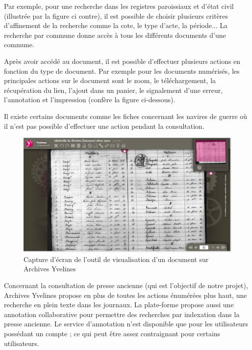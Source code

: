         Par exemple, pour une recherche dans les registres paroissiaux et d’état civil (illustrée par la figure ci contre),
        il est possible de choisir plusieurs critères d’affinement de la recherche comme la cote, le type d’acte, la période...
        La recherche par commune donne accès à tous les différents documents d’une commune.

        Après avoir accédé au document, il est possible d’effectuer plusieurs actions en fonction du type de document.
        Par exemple pour les documents numérisés, les principales actions sur le document sont le zoom, le téléchargement,
        la récupération du lien, l’ajout dans un panier, le signalement d’une erreur, l’annotation et l’impression (confère la figure ci-dessous).

        Il existe certains documents comme les fiches concernant les navires de guerre où il n’est pas possible d’effectuer
        une action pendant la consultation.

        \begin{figure}[h!]
            \centering
            \includegraphics[width=1\textwidth]{figure/screen_yvelines_document.png}
            \caption{Capture d'écran de l'outil de visualisation d'un document sur Archives Yvelines}
            \label{fig:yvelines_doc}
        \end{figure}

        Concernant la consultation de presse ancienne (qui est l’objectif de notre projet), Archives Yvelines propose en plus
        de toutes les actions énumérées plus haut, une recherche en plein texte dans les journaux. La plate-forme propose
        aussi une annotation collaborative pour permettre des recherches par indexation dans la presse ancienne. Le service d’annotation
        n’est disponible que pour les utilisateurs possédant un compte ; ce qui peut être assez contraignant pour certains utilisateurs.

